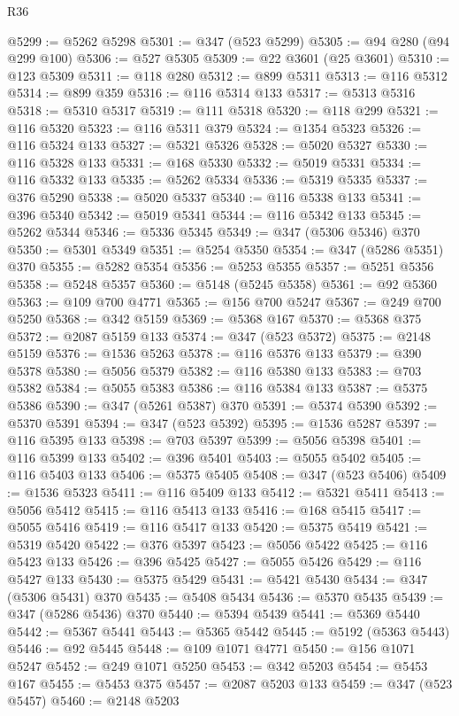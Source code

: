 \begin{lexlean}{R36}
\begin{coremodule}
@5299 := @5262 @5298
@5301 := @347 (@523 @5299)
@5305 := @94 @280 (@94 @299 @100)
@5306 := @527 @5305
@5309 := @22 @3601 (@25 @3601)
@5310 := @123 @5309
@5311 := @118 @280
@5312 := @899 @5311
@5313 := @116 @5312
@5314 := @899 @359
@5316 := @116 @5314 @133
@5317 := @5313 @5316
@5318 := @5310 @5317
@5319 := @111 @5318
@5320 := @118 @299
@5321 := @116 @5320
@5323 := @116 @5311 @379
@5324 := @1354 @5323
@5326 := @116 @5324 @133
@5327 := @5321 @5326
@5328 := @5020 @5327
@5330 := @116 @5328 @133
@5331 := @168 @5330
@5332 := @5019 @5331
@5334 := @116 @5332 @133
@5335 := @5262 @5334
@5336 := @5319 @5335
@5337 := @376 @5290
@5338 := @5020 @5337
@5340 := @116 @5338 @133
@5341 := @396 @5340
@5342 := @5019 @5341
@5344 := @116 @5342 @133
@5345 := @5262 @5344
@5346 := @5336 @5345
@5349 := @347 (@5306 @5346) @370
@5350 := @5301 @5349
@5351 := @5254 @5350
@5354 := @347 (@5286 @5351) @370
@5355 := @5282 @5354
@5356 := @5253 @5355
@5357 := @5251 @5356
@5358 := @5248 @5357
@5360 := @5148 (@5245 @5358)
@5361 := @92 @5360
@5363 := @109 @700 @4771
@5365 := @156 @700 @5247
@5367 := @249 @700 @5250
@5368 := @342 @5159
@5369 := @5368 @167
@5370 := @5368 @375
@5372 := @2087 @5159 @133
@5374 := @347 (@523 @5372)
@5375 := @2148 @5159
@5376 := @1536 @5263
@5378 := @116 @5376 @133
@5379 := @390 @5378
@5380 := @5056 @5379
@5382 := @116 @5380 @133
@5383 := @703 @5382
@5384 := @5055 @5383
@5386 := @116 @5384 @133
@5387 := @5375 @5386
@5390 := @347 (@5261 @5387) @370
@5391 := @5374 @5390
@5392 := @5370 @5391
@5394 := @347 (@523 @5392)
@5395 := @1536 @5287
@5397 := @116 @5395 @133
@5398 := @703 @5397
@5399 := @5056 @5398
@5401 := @116 @5399 @133
@5402 := @396 @5401
@5403 := @5055 @5402
@5405 := @116 @5403 @133
@5406 := @5375 @5405
@5408 := @347 (@523 @5406)
@5409 := @1536 @5323
@5411 := @116 @5409 @133
@5412 := @5321 @5411
@5413 := @5056 @5412
@5415 := @116 @5413 @133
@5416 := @168 @5415
@5417 := @5055 @5416
@5419 := @116 @5417 @133
@5420 := @5375 @5419
@5421 := @5319 @5420
@5422 := @376 @5397
@5423 := @5056 @5422
@5425 := @116 @5423 @133
@5426 := @396 @5425
@5427 := @5055 @5426
@5429 := @116 @5427 @133
@5430 := @5375 @5429
@5431 := @5421 @5430
@5434 := @347 (@5306 @5431) @370
@5435 := @5408 @5434
@5436 := @5370 @5435
@5439 := @347 (@5286 @5436) @370
@5440 := @5394 @5439
@5441 := @5369 @5440
@5442 := @5367 @5441
@5443 := @5365 @5442
@5445 := @5192 (@5363 @5443)
@5446 := @92 @5445
@5448 := @109 @1071 @4771
@5450 := @156 @1071 @5247
@5452 := @249 @1071 @5250
@5453 := @342 @5203
@5454 := @5453 @167
@5455 := @5453 @375
@5457 := @2087 @5203 @133
@5459 := @347 (@523 @5457)
@5460 := @2148 @5203

\end{coremodule}
\end{lexlean}
